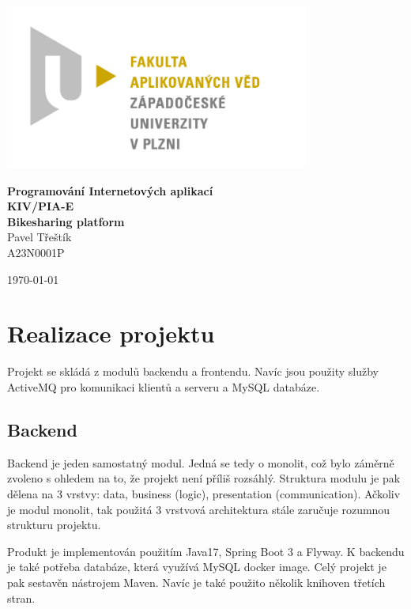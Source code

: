 \documentclass[12pt, letterpaper]{article}
\begin{document}
\begin{titlepage}
\centerline{\includegraphics[width=10cm]{img/logo}}
\begin{center}
\vspace{30px}
{\huge
\textbf{Programování Internetových aplikací}\\
\vspace{1cm}
}
{\Large
\textbf{KIV/PIA-E}\\
\vspace{1cm}
}
{\large
\textbf{Bikesharing platform}\\
\vspace{1cm}
}
\vspace{1cm}
{\large
Pavel Třeštík\\
}
{\normalsize
A23N0001P
}
\end{center}
\vspace{\fill}
\hfill
\begin{minipage}[t]{7cm}
\flushright
\today
\end{minipage}
\end{titlepage}
\section{Realizace projektu}
Projekt se skládá z modulů backendu a frontendu. Navíc jsou použity služby ActiveMQ pro komunikaci klientů a serveru
a MySQL databáze.
\subsection{Backend}
Backend je jeden samostatný modul. Jedná se tedy o monolit, což bylo záměrně zvoleno s ohledem na to, že projekt není
příliš rozsáhlý. Struktura modulu je pak dělena na 3 vrstvy: data, business (logic), presentation (communication).
Ačkoliv je modul monolit, tak použitá 3 vrstvová architektura stále zaručuje rozumnou strukturu projektu.

Produkt je implementován použitím Java17, Spring Boot 3 a Flyway. K backendu je také potřeba databáze, která využívá
MySQL docker image. Celý projekt je pak sestavěn nástrojem Maven. Navíc je také použito několik knihoven třetích stran.
%
\end{document}
